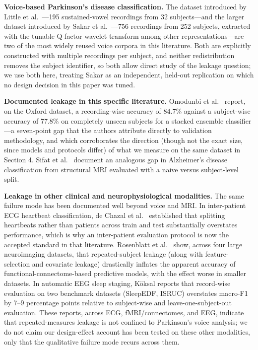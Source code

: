 \documentclass[11pt]{article}
\begin{document}
\textbf{Voice-based Parkinson's disease classification.} The dataset introduced by Little et al.\ \cite{little2007}---195 sustained-vowel recordings from 32 subjects---and the larger dataset introduced by Sakar et al.\ \cite{sakar2019}---756 recordings from 252 subjects, extracted with the tunable Q-factor wavelet transform among other representations---are two of the most widely reused voice corpora in this literature. Both are explicitly constructed with multiple recordings per subject, and neither redistribution removes the subject identifier, so both allow direct study of the leakage question; we use both here, treating Sakar as an independent, held-out replication on which no design decision in this paper was tuned.

\textbf{Documented leakage in this specific literature.} Omodunbi et al.\ \cite{omodunbi2025} report, on the Oxford dataset, a recording-wise accuracy of 84.7\% against a subject-wise accuracy of 77.8\% on completely unseen subjects for a stacked ensemble classifier---a seven-point gap that the authors attribute directly to validation methodology, and which corroborates the direction (though not the exact size, since models and protocols differ) of what we measure on the same dataset in Section 4. Sifat et al.\ \cite{sifat2026} document an analogous gap in Alzheimer's disease classification from structural MRI evaluated with a naive versus subject-level split.

\textbf{Leakage in other clinical and neurophysiological modalities.} The same failure mode has been documented well beyond voice and MRI. In inter-patient ECG heartbeat classification, de Chazal et al.\ \cite{dechazal2004} established that splitting heartbeats rather than patients across train and test substantially overstates performance, which is why an inter-patient evaluation protocol is now the accepted standard in that literature. Rosenblatt et al.\ \cite{rosenblatt2024} show, across four large neuroimaging datasets, that repeated-subject leakage (along with feature-selection and covariate leakage) drastically inflates the apparent accuracy of functional-connectome-based predictive models, with the effect worse in smaller datasets. In automatic EEG sleep staging, K{\"o}ksal \cite{koksal2026} reports that record-wise evaluation on two benchmark datasets (SleepEDF, ISRUC) overstates macro-F1 by 7--9 percentage points relative to subject-wise and leave-one-subject-out evaluation. These reports, across ECG, fMRI/connectomes, and EEG, indicate that repeated-measures leakage is not confined to Parkinson's voice analysis; we do not claim our design-effect account has been tested on these other modalities, only that the qualitative failure mode recurs across them.
\end{document}
